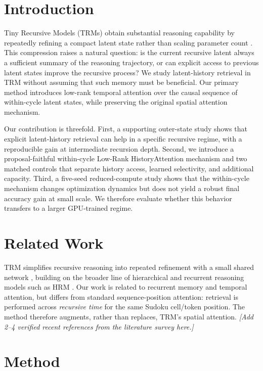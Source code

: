 
\section{Introduction}
Tiny Recursive Models (TRMs) obtain substantial reasoning capability by
repeatedly refining a compact latent state rather than scaling parameter count
\cite{trm}. This compression raises a natural question: is the current
recursive latent always a sufficient summary of the reasoning trajectory, or
can explicit access to previous latent states improve the recursive process?
We study latent-history retrieval in TRM without assuming that such memory must
be beneficial. Our primary method introduces low-rank temporal attention over
the causal sequence of within-cycle latent states, while preserving the
original spatial attention mechanism.

Our contribution is threefold. First, a supporting outer-state study shows
that explicit latent-history retrieval can help in a specific recursive
regime, with a reproducible gain at intermediate recursion depth. Second, we
introduce a proposal-faithful within-cycle Low-Rank HistoryAttention mechanism
and two matched controls that separate history access, learned selectivity, and
additional capacity. Third, a five-seed reduced-compute study shows that the
within-cycle mechanism changes optimization dynamics but does not yield a
robust final accuracy gain at small scale. We therefore evaluate whether this
behavior transfers to a larger GPU-trained regime.

\section{Related Work}
TRM simplifies recursive reasoning into repeated refinement with a small
shared network \cite{trm}, building on the broader line of hierarchical and
recurrent reasoning models such as HRM \cite{hrm}. Our work is related to
recurrent memory and temporal attention, but differs from standard
sequence-position attention: retrieval is performed across \emph{recursive
time} for the same Sudoku cell/token position. The method therefore augments,
rather than replaces, TRM's spatial attention. \emph{[Add 2--4 verified recent
references from the literature survey here.]}

\section{Method}

